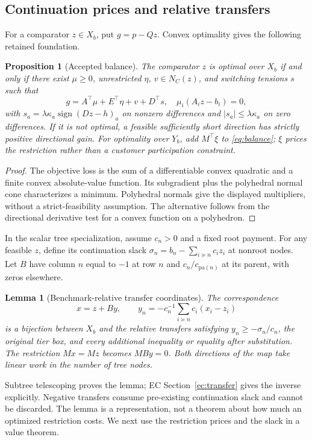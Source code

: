 \documentclass[11pt,letterpaper]{article}
\newtheorem{proposition}[theorem]{Proposition}
\newtheorem{lemma}[theorem]{Lemma}
\theoremstyle{definition}\newtheorem{assumption}[theorem]{Assumption}
\begin{document}
\subsection{Continuation prices and relative transfers}
For a comparator $z\in X_b$, put $g=p-Qz$. Convex optimality gives the following retained foundation.
\begin{proposition}[Accepted balance]\label{prop:balance}
The comparator $z$ is optimal over $X_b$ if and only if there exist $\mu\geq0$, unrestricted $\eta$, $v\in N_C(z)$, and switching tensions $s$ such that
\begin{equation}\label{eq:balance}
 g=A^\top\mu+E^\top\eta+v+D^\top s,\quad
 \mu_i(A_i z-b_i)=0,
\end{equation}
with $s_a=\lambda\kappa_a\operatorname{sign}(Dz-h)_a$ on nonzero differences and $|s_a|\leq\lambda\kappa_a$ on zero differences. If it is not optimal, a feasible sufficiently short direction has strictly positive directional gain. For optimality over $Y_b$, add $M^\top\xi$ to \eqref{eq:balance}; $\xi$ prices the restriction rather than a customer participation constraint.
\end{proposition}
\begin{proof}
The objective loss is the sum of a differentiable convex quadratic and a finite convex absolute-value function. Its subgradient plus the polyhedral normal cone characterizes a minimum. Polyhedral normals give the displayed multipliers, without a strict-feasibility assumption. The alternative follows from the directional derivative test for a convex function on a polyhedron.\end{proof}

In the scalar tree specialization, assume $c_n>0$ and a fixed root payment. For any feasible $z$, define its continuation slack $\sigma_n=b_n-\sum_{i\succeq n}c_i z_i$ at nonroot nodes. Let $B$ have column $n$ equal to $-1$ at row $n$ and $c_n/c_{\mathrm{pa}(n)}$ at its parent, with zeros elsewhere.
\begin{lemma}[Benchmark-relative transfer coordinates]\label{lem:transfers}
The correspondence
\begin{equation}\label{eq:transfers}
 x=z+By,\qquad y_n=-c_n^{-1}\sum_{i\succeq n}c_i(x_i-z_i)
\end{equation}
is a bijection between $X_b$ and the relative transfers satisfying
$y_n\geq-\sigma_n/c_n$, the original tier box, and every additional inequality or equality after substitution. The restriction $Mx=Mz$ becomes $MBy=0$. Both directions of the map take linear work in the number of tree nodes.
\end{lemma}
Subtree telescoping proves the lemma; EC Section~\ref{ec:transfer} gives the inverse explicitly. Negative transfers consume pre-existing continuation slack and cannot be discarded. The lemma is a representation, not a theorem about how much an optimized restriction costs. We next use the restriction prices and the slack in a value theorem.
\end{document}
